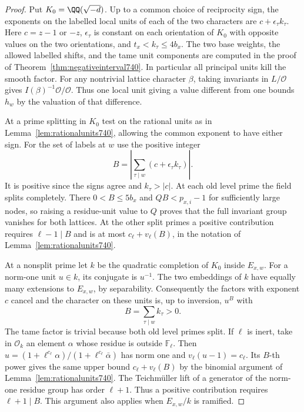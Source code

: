 \documentclass[a4paper,11pt]{article}
\theoremstyle{definition}
\theoremstyle{remark}
\numberwithin{equation}{section}
\begin{document}
\begin{proof}
Put \(K_0=\QQ(\sqrt{-d})\). Up to a common choice of reciprocity
sign, the exponents on the labelled local units of each of the
two characters are \(c+\epsilon_\tau k_\tau\). Here
\(c=z-1\) or \(-z\), \(\epsilon_\tau\) is constant on each
orientation of \(K_0\) with opposite values on the two orientations,
and \(t_x<k_\tau\le4b_x\). The two base weights, the allowed
labelled shifts, and the tame unit components are computed in the proof of
Theorem~\ref{thm:negativeinterval740}. In particular all
principal units kill the smooth factor. For any nontrivial
lattice character \(\beta\), taking invariants in \(L/\mathcal O\)
gives \(I(\beta)^{-1}\mathcal O/\mathcal O\). Thus one local
unit giving a value different from one bounds \(h_w\) by the
valuation of that difference.

At a prime splitting in \(K_0\) test on the rational units as
in Lemma~\ref{lem:rationalunits740}, allowing the common
exponent to have either sign. For the set of labels at \(w\)
use the positive integer
\[
       B=\left|\sum_{\tau\mid w}(c+\epsilon_\tau k_\tau)\right|.
\]
It is positive since the signs agree and \(k_\tau>|c|\).
At each old level prime the field splits completely. There
\(0<B\le5b_x\) and \(QB<p_{x,i}-1\) for sufficiently large
nodes, so raising a residue-unit value to \(Q\) proves that
the full invariant group vanishes for both lattices. At the
other split primes a positive contribution requires \(\ell-1\mid B\)
and is at most \(c_\ell+v_\ell(B)\), in the notation of
Lemma~\ref{lem:rationalunits740}.

At a nonsplit prime let \(k\) be the quadratic completion of
\(K_0\) inside \(E_{x,w}\). For a norm-one unit \(u\in k\), its
conjugate is \(u^{-1}\). The two embeddings of \(k\) have
equally many extensions to \(E_{x,w}\), by separability.
Consequently the factors with exponent \(c\) cancel and the
character on these units is, up to inversion, \(u^B\) with
\[
                          B=\sum_{\tau\mid w}k_\tau>0 .
\]
The tame factor is trivial because both old level primes split.
If \(\ell\) is inert, take in \(\mathcal O_k\) an element
\(\alpha\) whose residue is outside \(\mathbb F_\ell\).
Then \(u=(1+\ell^{c_\ell}\alpha)/(1+\ell^{c_\ell}\bar\alpha)\)
has norm one and \(v_\ell(u-1)=c_\ell\). Its \(B\)-th power
gives the same upper bound \(c_\ell+v_\ell(B)\) by the binomial
argument of Lemma~\ref{lem:rationalunits740}. The Teichmüller
lift of a generator of the norm-one residue group has order
\(\ell+1\). Thus a positive contribution requires \(\ell+1\mid B\).
This argument also applies when \(E_{x,w}/k\) is ramified.


\end{proof}
\end{document}
